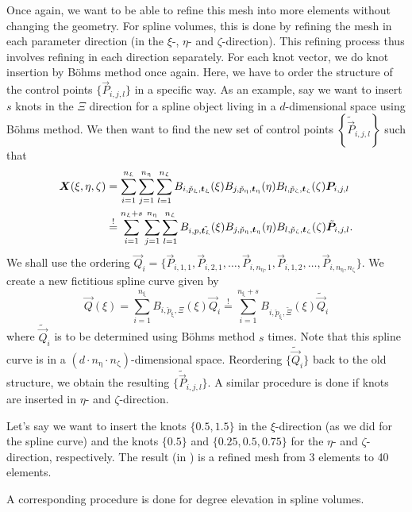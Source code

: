 Once again, we want to be able to refine this mesh into more elements without changing the geometry. For spline volumes, this is done by refining the mesh in each parameter direction (in the $\xi$-, $\eta$- and $\zeta$-direction). This refining process thus involves refining in each direction separately. For each knot vector, we do knot insertion by B\"{o}hms method once again. Here, we have to order the structure of the control points $\{\vec{P}_{i,j,l}\}$ in a specific way. As an example, say we want to insert $s$ knots in the $\Xi$ direction for a spline object living in a $d$-dimensional space using B\"{o}hms method. We then want to find the new set of control points $\left\{\tilde{\vec{P}}_{i,j,l}\right\}$ such that
\begin{align*}
	\vec{X}(\xi,\eta,\zeta) &= \sum_{i=1}^{n_\upxi}\sum_{j=1}^{n_\upeta}\sum_{l=1}^{n_\upzeta} B_{i,\check{p}_\upxi,\Xi}(\xi)B_{j,\check{p}_\upeta,\Eta}(\eta)B_{l,\check{p}_\upzeta,\Zeta}(\zeta)\vec{P}_{i,j,l}\\
	 &\overset{!}{=} \sum_{i=1}^{n_\upxi+s}\sum_{j=1}^{n_\upeta}\sum_{l=1}^{n_\upzeta} B_{i,p,\tilde{\Xi}}(\xi)B_{j,\check{p}_\upeta,\Eta}(\eta)B_{l,\check{p}_\upzeta,\Zeta}(\zeta)\tilde{\vec{P}}_{i,j,l}.
\end{align*}
We shall use the ordering $\vec{Q}_i = \{\vec{P}_{i,1,1}, \vec{P}_{i,2,1},\dots,\vec{P}_{i,n_\upeta,1},\vec{P}_{i,1,2},\dots,\vec{P}_{i,n_\upeta,n_\upzeta}\}$. We create a new fictitious spline curve given by
\begin{equation*}
	\vec{Q}(\xi) = \sum_{i=1}^{n_\upxi} B_{i,\check{p}_\upxi,\Xi}(\xi) \vec{Q}_i \overset{!}{=} \sum_{i=1}^{n_\upxi+s} B_{i,\check{p}_\upxi,\tilde{\Xi}}(\xi) \tilde{\vec{Q}}_i
\end{equation*}
where $\tilde{\vec{Q}}_i$ is to be determined using B\"{o}hms method $s$ times. Note that this spline curve is in a $(d\cdot n_\upeta\cdot n_\upzeta)$-dimensional space. Reordering $\{\tilde{\vec{Q}}_i\}$ back to the old structure, we obtain the resulting $\{\tilde{\vec{P}}_{i,j,l}\}$. A similar procedure is done if knots are inserted in $\eta$- and $\zeta$-direction. 

Let's say we want to insert the knots $\{0.5, 1.5\}$ in the $\xi$-direction (as we did for the spline curve) and the knots $\{0.5\}$ and $\{0.25, 0.5, 0.75\}$ for the $\eta$- and $\zeta$-direction, respectively. The result (in ) is a refined mesh from 3 elements to 40 elements.

A corresponding procedure is done for degree elevation in spline volumes.

